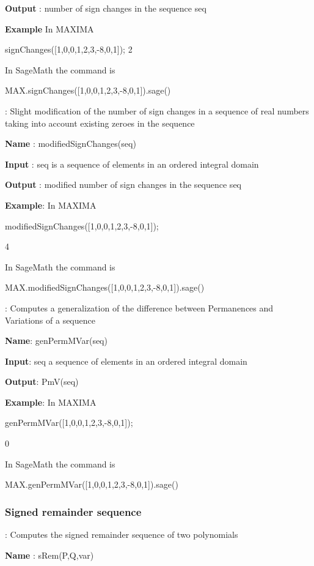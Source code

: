 \documentclass{article}
\begin{document}
{\bf Output} : number of sign changes in the sequence seq
  
{\bf Example} In MAXIMA

 signChanges([1,0,0,1,2,3,-8,0,1]);
 2
  
  \noindent In SageMath the command is
  
  MAX.signChanges([1,0,0,1,2,3,-8,0,1]).sage()
  

  :   Slight modification of the number of sign changes in a sequence of real numbers taking into account existing zeroes in the sequence
  
{\bf Name} : modifiedSignChanges(seq)
  
{\bf  Input} : seq is a sequence of elements in an ordered integral domain
  
{\bf Output} : modified number of sign changes in the sequence seq
  
{\bf Example}: In MAXIMA

 modifiedSignChanges([1,0,0,1,2,3,-8,0,1]);
 
 4
  
  \noindent In SageMath the command is
  
  MAX.modifiedSignChanges([1,0,0,1,2,3,-8,0,1]).sage()
  

:
  Computes a generalization of the difference between Permanences and
  Variations of a sequence
  
{\bf Name}: genPermMVar(seq)
  
 {\bf Input}: seq a sequence of elements in an ordered integral domain
  
 {\bf  Output}: PmV(seq)
  
 {\bf Example}: In MAXIMA

genPermMVar([1,0,0,1,2,3,-8,0,1]);

0
  
  \noindent In SageMath the command is
  
  MAX.genPermMVar([1,0,0,1,2,3,-8,0,1]).sage()
  

\subsubsection{Signed remainder sequence}


:
  Computes the signed remainder sequence of two polynomials
  
{\bf Name} : sRem(P,Q,var)
  
\end{document}
